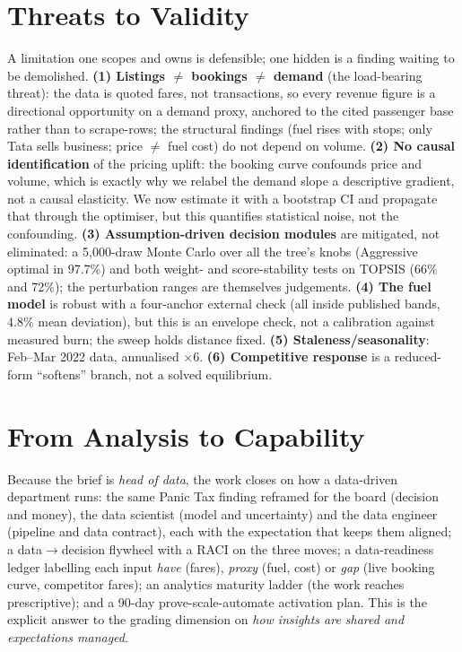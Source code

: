 \documentclass[conference]{IEEEtran}
\begin{document}
\section{Threats to Validity}
A limitation one scopes and owns is defensible; one hidden is a finding waiting to be demolished. \textbf{(1) Listings $\neq$ bookings $\neq$ demand} (the load-bearing threat): the data is quoted fares, not transactions, so every revenue figure is a directional opportunity on a demand proxy, anchored to the cited passenger base rather than to scrape-rows; the structural findings (fuel rises with stops; only Tata sells business; price $\neq$ fuel cost) do not depend on volume. \textbf{(2) No causal identification} of the pricing uplift: the booking curve confounds price and volume, which is exactly why we relabel the demand slope a descriptive gradient, not a causal elasticity. We now estimate it with a bootstrap CI and propagate that through the optimiser, but this quantifies statistical noise, not the confounding. \textbf{(3) Assumption-driven decision modules} are mitigated, not eliminated: a 5{,}000-draw Monte Carlo over all the tree's knobs (Aggressive optimal in 97.7\%) and both weight- and score-stability tests on TOPSIS (66\% and 72\%); the perturbation ranges are themselves judgements. \textbf{(4) The fuel model} is robust with a four-anchor external check (all inside published bands, 4.8\% mean deviation), but this is an envelope check, not a calibration against measured burn; the sweep holds distance fixed. \textbf{(5) Staleness/seasonality}: Feb--Mar 2022 data, annualised $\times6$. \textbf{(6) Competitive response} is a reduced-form ``softens'' branch, not a solved equilibrium.

\section{From Analysis to Capability}
Because the brief is \emph{head of data}, the work closes on how a data-driven department runs: the same Panic Tax finding reframed for the board (decision and money), the data scientist (model and uncertainty) and the data engineer (pipeline and data contract), each with the expectation that keeps them aligned; a data$\to$decision flywheel with a RACI on the three moves; a data-readiness ledger labelling each input \emph{have} (fares), \emph{proxy} (fuel, cost) or \emph{gap} (live booking curve, competitor fares); an analytics maturity ladder (the work reaches prescriptive); and a 90-day prove-scale-automate activation plan. This is the explicit answer to the grading dimension on \emph{how insights are shared and expectations managed}.
\end{document}

